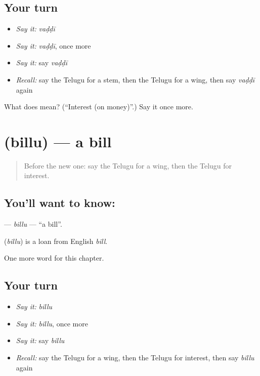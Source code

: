 \subsection*{Your turn}
\begin{itemize}
\raggedright
  \item \emph{Say it:} \emph{vaḍḍī}
  \item \emph{Say it:} \emph{vaḍḍī}, once more
  \item \emph{Say it:} say \emph{vaḍḍī}
  \item \emph{Recall:} say the Telugu for a stem, then the Telugu for a wing, then say \emph{vaḍḍī} again
\end{itemize}

\begin{tcolorbox}[breakable,colback=teal!4,colframe=teal!35!black,title={Before you move on}]
What does  mean? (\textquotedblleft{}Interest (on money)\textquotedblright{}.) Say it once more.
\end{tcolorbox}
\section[\texorpdfstring{\te{బిల్లు} (billu)}{బిల్లు (billu)}]{ (billu) — a bill}

\label{lesson:TE-C273-billu}



\begin{quote}
Before the new one: say the Telugu for a wing, then the Telugu for interest.
\end{quote}

\subsection*{You'll want to know: }
\textbf{} — \emph{billu} — \textquotedblleft{}a bill\textquotedblright{}.

\begin{cousinweb}
\textbf{} (\emph{billu}) is a loan from English \emph{bill}.
\end{cousinweb}

\begin{grammarlens}[title={What you've built}]
One more word for this chapter.
\end{grammarlens}

\subsection*{Your turn}
\begin{itemize}
\raggedright
  \item \emph{Say it:} \emph{billu}
  \item \emph{Say it:} \emph{billu}, once more
  \item \emph{Say it:} say \emph{billu}
  \item \emph{Recall:} say the Telugu for a wing, then the Telugu for interest, then say \emph{billu} again
\end{itemize}

